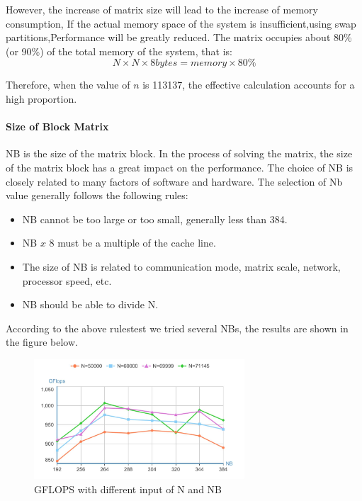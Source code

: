 \documentclass[a4paper,12pt]{article}
\begin{document}
However, the increase of matrix size will lead to the increase of memory consumption, If the actual memory space of the system is insufficient,using swap partitions,Performance will be greatly reduced. The matrix occupies about 80\% (or 90\%) of the total memory of the system, that is:
\begin{equation*}
N \times N \times 8bytes = memory \times 80\%
\end{equation*}

Therefore, when the value of \( n \) is 113137, the effective calculation accounts for a high proportion.

\paragraph{Size of Block Matrix}

NB is the size of the matrix block. In the process of solving the matrix, the size of the matrix block has a great impact on the performance. The choice of NB is closely related to many factors of software and hardware. The selection of Nb value generally follows the following rules:
\begin{itemize}
    \item NB cannot be too large or too small, generally less than 384.
    \item NB \( x \) 8 must be a multiple of the cache line.
    \item The size of NB is related to communication mode, matrix scale, network, processor speed, etc.
    \item NB should be able to divide N.
\end{itemize}

According to the above rulestest we tried several NBs, the results are shown in the figure below.

\begin{figure}[H]
    \centering
    \includegraphics[width=0.7\textwidth]{images/performance/GFLOPS_NB.png}
    \caption{GFLOPS with different input of N and NB}
    \label{fig:gflops_nb}
\end{figure}
\end{document}
